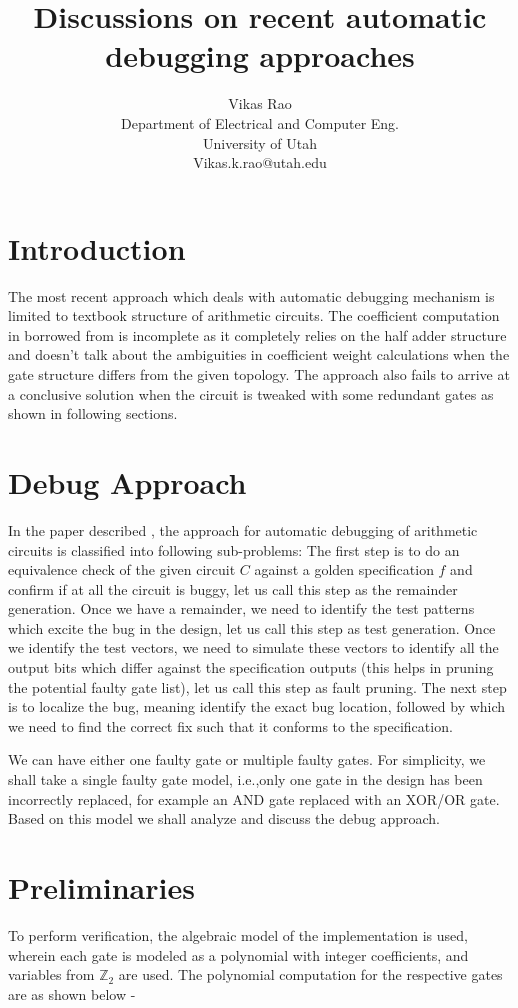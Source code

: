 \documentclass{article}
\title{Discussions on recent automatic debugging approaches}
\author{Vikas Rao\\
Department of  Electrical and Computer Eng.\\
University of Utah\\Vikas.k.rao@utah.edu }
\date{}
\begin{document}
\maketitle
\section{Introduction}
The most recent approach which deals with automatic debugging mechanism \cite{farimah:2016} is limited to textbook structure of arithmetic circuits. The coefficient computation in \cite{farimah:2016} borrowed from \cite{maciej:2015:2} is incomplete as it completely relies on the half adder structure and doesn't talk about the ambiguities in coefficient weight calculations when the gate structure differs from the given topology. The approach also fails to arrive at a conclusive solution when the circuit is tweaked with some redundant gates as shown in following sections.

\section{Debug Approach}
In the paper described \cite{farimah:2016}, the approach for automatic debugging of arithmetic circuits is classified into following sub-problems: The first step is to do an equivalence check of the given circuit $C$ against a golden specification $f$ and confirm if at all the circuit is buggy, let us call this step as the remainder generation. Once we have a remainder, we need to identify the test patterns which excite the bug in the design, let us call this step as test generation. Once we identify the test vectors, we need to simulate these vectors to identify all the output bits which differ against the specification outputs (this helps in pruning the potential faulty gate list), let us call this step as fault pruning. The next step is to localize the bug, meaning identify the exact bug location, followed by which we need to find the correct fix such that it conforms to the specification.

We can have either one faulty gate or multiple faulty gates. For simplicity, we shall take a single faulty gate model, i.e.,only one gate in the design has been incorrectly replaced, for example an AND gate replaced with an XOR/OR gate. Based on this model we shall analyze and discuss the debug approach.

\section{Preliminaries}
To perform verification, the algebraic model of the implementation is used, wherein each gate is modeled as a polynomial with integer coefficients, and variables from $\mathbb{Z}_2$ are used. The polynomial computation for the respective gates are as shown below -
\end{document}
